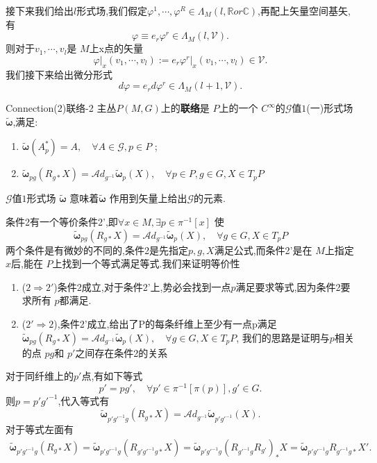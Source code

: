 \documentclass[../main.tex]{subfiles}
\begin{document}
接下来我们给出$l$形式场,我们假定$\varphi^1,\cdots ,\varphi^R \in \Lambda_M(l, \mathbb{R} or \mathbb{C})$,再配上矢量空间基矢,有\[
\varphi \equiv e_r\varphi^r \in\Lambda_M(l,\mathscr{V}) 
.\] 
则对于$v_1,\cdots,v_l$是 $M$上x点的矢量 \[
\left.\varphi\right|_x(v_1,\cdots,v_l) := e_r\varphi^r|_x(v_1,\cdots , v_l) \in \mathscr{V} 
.\] 
我们接下来给出微分形式\[
d\varphi = e_r d\varphi^r \in\Lambda_M(l+1,\mathscr{V}) 
.\] 
\begin{definition}
  {Connection(2)}{联络-2}
  主丛$P(M,G)$上的\textbf{联络}是 $P$上的一个 $C^\infty$的$\mathscr{G}$值$1$(一)形式场$\bm{\tilde{\omega}} $,满足:
 \begin{enumerate}
   \item $ \bm{\tilde{\omega}}(A^*_p) = A, \quad \forall A \in \mathscr{G},p \in P $ ;
   \item $\bm{\tilde{\omega}}_{pg}(R_{g*}X) = \mathscr{A}\!d_{g^{-1}} \bm{\tilde{\omega}}_p(X), \quad \forall p \in P, g \in G, X \in  T_pP $
 \end{enumerate} 
\end{definition}
 \begin{note}
   $\mathscr{G}$值$1$形式场 $\bm{\tilde{\omega}} $ 意味着$\bm{\tilde{\omega}}$ 作用到矢量上给出$\mathscr{G}$的元素.
\end{note}
条件2有一个等价条件2’,即$\forall x \in M,\exists p \in \pi^{-1}[x]$ 使\[\bm{\tilde{\omega}}_{pg}(R_{g*}X) = \mathscr{A}\!d_{g^{-1}}\bm{\tilde{\omega}}_p(X), \quad \forall g \in G, X \in T_pP  \]
两个条件是有微妙的不同的,条件2是先指定$p,g,X$满足公式,而条件2'是在 $M$上指定 $x$后,能在 $P$上找到一个等式满足等式.我们来证明等价性
\begin{enumerate}
  \item ($2 \Rightarrow 2'$)条件2成立,对于条件2'上,势必会找到一点$p$满足要求等式,因为条件2要求所有 $p$都满足.
  \item ($2' \Rightarrow 2$),条件2'成立,给出了P的每条纤维上至少有一点p满足$\bm{\tilde{\omega}}_{pg}(R_{g*}X) = \mathscr{A}\!d_{g^{-1}}\bm{\tilde{\omega}}_p(X), \quad \forall  g \in G, X \in T_pP $,
    我们的思路是证明与$p$相关的点 $pg$和 $p'$之间存在条件2的关系
\end{enumerate}
    对于同纤维上的$p'$点,有如下等式 \[
      p' = pg',\quad \forall p' \in \pi^{-1}[\pi(p)], g'\in G
    .\] 则$p = p'g'^{-1}$,代入等式有\[
    \bm{\tilde{\omega}}_{p'g'^{-1}g}(R_{g*}X) = \mathscr{A}\!d_{g^{-1}}\bm{\tilde{\omega}}_{p'g'^{-1}}(X)
    .\] 
    对于等式左面有
    \begin{align}
      \bm{\tilde{\omega}}_{p'g'^{-1}g}(R_{g*}X) =  \bm{\tilde{\omega}}_{p'g'^{-1}g}(R_{g'g'^{-1}g*}X) = \bm{\tilde{\omega}}_{p'g'^{-1}g}(R_{g'^{-1}g}R_{g'})_{*}X = \bm{\tilde{\omega}}_{p'g'^{-1}g}R_{g'^{-1}g*}X'
      \label{eq:I-2-1}
    .\end{align} 
\end{document}
